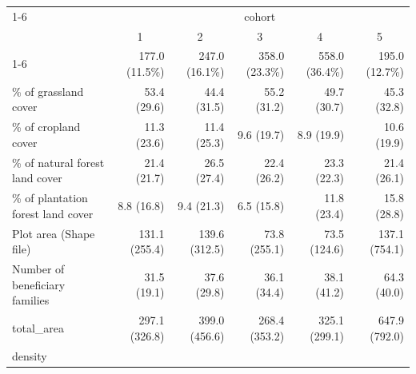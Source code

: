 \documentclass{article}
\begin{document}
\begin{table}[!h]
\centering
\begin{tabular}{llllll}
\cline{1-6}
\multicolumn{1}{r}{} &
  \multicolumn{5}{c}{cohort} \\
\multicolumn{1}{r}{} &
  \multicolumn{1}{c}{1} &
  \multicolumn{1}{c}{2} &
  \multicolumn{1}{c}{3} &
  \multicolumn{1}{c}{4} &
  \multicolumn{1}{c}{5} \\
\cline{1-6}
\multicolumn{1}{l}{N} &
  \multicolumn{1}{r}{177.0 (11.5\%)} &
  \multicolumn{1}{r}{247.0 (16.1\%)} &
  \multicolumn{1}{r}{358.0 (23.3\%)} &
  \multicolumn{1}{r}{558.0 (36.4\%)} &
  \multicolumn{1}{r}{195.0 (12.7\%)} \\
\multicolumn{1}{l}{\% of grassland cover} &
  \multicolumn{1}{r}{53.4 (29.6)} &
  \multicolumn{1}{r}{44.4 (31.5)} &
  \multicolumn{1}{r}{55.2 (31.2)} &
  \multicolumn{1}{r}{49.7 (30.7)} &
  \multicolumn{1}{r}{45.3 (32.8)} \\
\multicolumn{1}{l}{\% of cropland cover} &
  \multicolumn{1}{r}{11.3 (23.6)} &
  \multicolumn{1}{r}{11.4 (25.3)} &
  \multicolumn{1}{r}{9.6 (19.7)} &
  \multicolumn{1}{r}{8.9 (19.9)} &
  \multicolumn{1}{r}{10.6 (19.9)} \\
\multicolumn{1}{l}{\% of natural forest land cover} &
  \multicolumn{1}{r}{21.4 (21.7)} &
  \multicolumn{1}{r}{26.5 (27.4)} &
  \multicolumn{1}{r}{22.4 (26.2)} &
  \multicolumn{1}{r}{23.3 (22.3)} &
  \multicolumn{1}{r}{21.4 (26.1)} \\
\multicolumn{1}{l}{\% of plantation forest land cover} &
  \multicolumn{1}{r}{8.8 (16.8)} &
  \multicolumn{1}{r}{9.4 (21.3)} &
  \multicolumn{1}{r}{6.5 (15.8)} &
  \multicolumn{1}{r}{11.8 (23.4)} &
  \multicolumn{1}{r}{15.8 (28.8)} \\
\multicolumn{1}{l}{Plot area (Shape file)} &
  \multicolumn{1}{r}{131.1 (255.4)} &
  \multicolumn{1}{r}{139.6 (312.5)} &
  \multicolumn{1}{r}{73.8 (255.1)} &
  \multicolumn{1}{r}{73.5 (124.6)} &
  \multicolumn{1}{r}{137.1 (754.1)} \\
\multicolumn{1}{l}{Number of beneficiary families} &
  \multicolumn{1}{r}{31.5 (19.1)} &
  \multicolumn{1}{r}{37.6 (29.8)} &
  \multicolumn{1}{r}{36.1 (34.4)} &
  \multicolumn{1}{r}{38.1 (41.2)} &
  \multicolumn{1}{r}{64.3 (40.0)} \\
\multicolumn{1}{l}{total\_area} &
  \multicolumn{1}{r}{297.1 (326.8)} &
  \multicolumn{1}{r}{399.0 (456.6)} &
  \multicolumn{1}{r}{268.4 (353.2)} &
  \multicolumn{1}{r}{325.1 (299.1)} &
  \multicolumn{1}{r}{647.9 (792.0)} \\
\multicolumn{1}{l}{density} &

\end{tabular}
\end{table}
\end{document}
